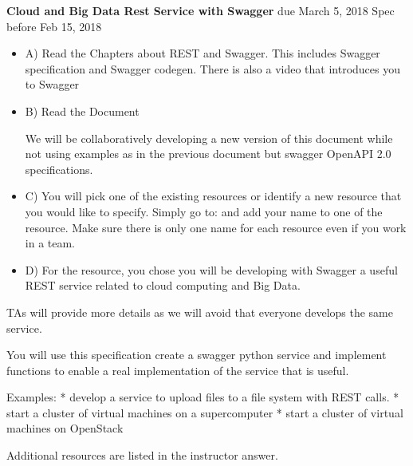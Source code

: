 \begin{exercise} {\bf Cloud and Big Data Rest Service with Swagger} due March 5, 2018 Spec before Feb 15, 2018

\begin{itemize}
     
   \item A) Read the Chapters about REST and Swagger. This includes Swagger specification and Swagger codegen. There is also a video that introduces you to Swagger 
 
   \item B) Read the Document 
 
We will be collaboratively developing a new version of this document while not using examples as in the previous document but swagger OpenAPI 2.0 specifications. 
 
   \item C) You will pick one of the existing resources or identify a new resource that you would like to specify. Simply go to:
and add your name to one of the resource. Make sure there is only one name for each resource even if you work in a team.
 
   \item D) For the resource, you chose you will be developing with Swagger a useful REST service related to cloud computing and Big Data.
 
 \end{itemize}
TAs will provide more details as we will avoid that everyone develops the same service. 
 
You will use this specification create a swagger python service and implement functions to enable a real implementation of the service that is useful.
 
Examples:
* develop a service to upload files to a file system with REST calls.
* start a cluster of virtual machines on a supercomputer
* start a cluster of virtual machines on OpenStack
 
Additional resources are listed in the instructor answer. 
\end{exercise}

